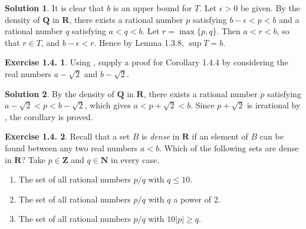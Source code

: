 \documentclass[12pt]{article}
\theoremstyle{definition}
\theoremstyle{exercise}
\newtheorem{exercise}{Exercise 1.4.}
\theoremstyle{solution}
\newtheorem*{solution}{Solution}
\newcommand{\N}{\mathbf{N}}
\newcommand{\Z}{\mathbf{Z}}
\newcommand{\Q}{\mathbf{Q}}
\newcommand{\R}{\mathbf{R}}
\begin{document}
\begin{solution}
    It is clear that \( b \) is an upper bound for \( T \). Let \( \epsilon > 0 \) be given. By the density of \( \Q \) in \( \R \), there exists a rational number \( p \) satisfying \( b - \epsilon < p < b \) and a rational number \( q \) satisfying \( a < q < b \). Let \( r = \max \{p , q\} \). Then \( a < r < b \), so that \( r \in T \), and \( b - \epsilon < r \). Hence by Lemma 1.3.8, \( \sup T = b \).
\end{solution}

\begin{exercise}
\label{ex:5}
    Using , supply a proof for Corollary 1.4.4 by considering the real numbers \( a - \sqrt{2} \) and \( b - \sqrt{2} \).
\end{exercise}

\begin{solution}
    By the density of \( \Q \) in \( \R \), there exists a rational number \( p \) satisfying \( a - \sqrt{2} < p < b - \sqrt{2} \), which gives \( a < p + \sqrt{2} < b \). Since \( p + \sqrt{2} \) is irrational by , the corollary is proved.
\end{solution}

\begin{exercise}
\label{ex:6}
    Recall that a set \( B \) is \textit{dense} in \( \R \) if an element of \( B \) can be found between any two real numbers \( a < b \). Which of the following sets are dense in \( \R \)? Take \( p \in \Z \) and \( q \in \N \) in every case.
    \begin{enumerate}
        \item The set of all rational numbers \( p/q \) with \( q \leq 10 \).

        \item The set of all rational numbers \( p/q \) with \( q \) a power of 2.

        \item The set of all rational numbers \( p/q \) with \( 10|p| \geq q \).
    \end{enumerate}
\end{exercise}
\end{document}
